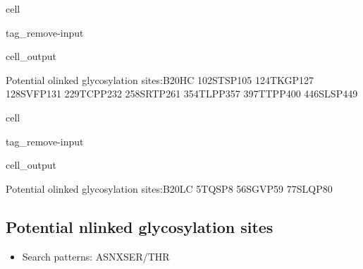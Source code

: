 \documentclass[letterpaper,10pt,english]{jupyterBook}
\begin{document}
\begin{sphinxuseclass}{cell}
\begin{sphinxuseclass}{tag_remove-input}\begin{sphinxVerbatimOutput}

\begin{sphinxuseclass}{cell_output}
\begin{sphinxVerbatim}[commandchars=\\\{\}]
Potential o\PYGZhy{}linked glycosylation sites:\PYGZhy{}\PYGZhy{}\PYGZhy{}\PYGZhy{}\PYGZhy{}\PYGZhy{}\PYGZhy{}\PYGZhy{}\PYGZhy{}\PYGZhy{}\PYGZhy{}\PYGZhy{}\PYGZhy{}\PYGZhy{}B20\PYGZus{}HC
102\PYGZhy{}STSP\PYGZhy{}105
124\PYGZhy{}TKGP\PYGZhy{}127
128\PYGZhy{}SVFP\PYGZhy{}131
229\PYGZhy{}TCPP\PYGZhy{}232
258\PYGZhy{}SRTP\PYGZhy{}261
354\PYGZhy{}TLPP\PYGZhy{}357
397\PYGZhy{}TTPP\PYGZhy{}400
446\PYGZhy{}SLSP\PYGZhy{}449
\end{sphinxVerbatim}

\end{sphinxuseclass}\end{sphinxVerbatimOutput}

\end{sphinxuseclass}
\end{sphinxuseclass}
\begin{sphinxuseclass}{cell}
\begin{sphinxuseclass}{tag_remove-input}\begin{sphinxVerbatimOutput}

\begin{sphinxuseclass}{cell_output}
\begin{sphinxVerbatim}[commandchars=\\\{\}]
Potential o\PYGZhy{}linked glycosylation sites:\PYGZhy{}\PYGZhy{}\PYGZhy{}\PYGZhy{}\PYGZhy{}\PYGZhy{}\PYGZhy{}\PYGZhy{}\PYGZhy{}\PYGZhy{}\PYGZhy{}\PYGZhy{}\PYGZhy{}\PYGZhy{}B20\PYGZus{}LC
5\PYGZhy{}TQSP\PYGZhy{}8
56\PYGZhy{}SGVP\PYGZhy{}59
77\PYGZhy{}SLQP\PYGZhy{}80
\end{sphinxVerbatim}

\end{sphinxuseclass}\end{sphinxVerbatimOutput}

\end{sphinxuseclass}
\end{sphinxuseclass}

\subsection{Potential n\sphinxhyphen{}linked glycosylation sites}
\label{\detokenize{ipynb/chapter1:potential-n-linked-glycosylation-sites}}\begin{itemize}
\item {} 
\sphinxAtStartPar
Search patterns: ASN\sphinxhyphen{}X\sphinxhyphen{}SER/THR

\end{itemize}
\end{document}
